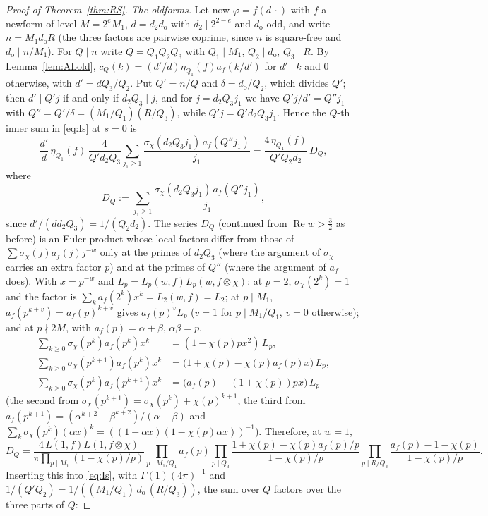 ﻿\documentclass[11pt]{amsart}
\theoremstyle{remark}
\begin{document}
\begin{proof}[Proof of Theorem~\ref{thm:RS}]
\emph{The oldforms.} Let now $\varphi=f(d\,\cdot)$ with $f$ a newform of level $M=2^eM_1$, $d=d_2d_{\mathrm{o}}$ with $d_2\mid2^{2-e}$ and $d_{\mathrm{o}}$ odd, and write $n=M_1d_{\mathrm{o}}R$ (the three factors are pairwise coprime, since $n$ is square-free and $d_{\mathrm{o}}\mid n/M_1$). For $Q\mid n$ write $Q=Q_1Q_2Q_3$ with $Q_1\mid M_1$, $Q_2\mid d_{\mathrm{o}}$, $Q_3\mid R$. By Lemma~\ref{lem:ALold}, $c_Q(k)=(d'/d)\eta_{Q_1}(f)a_f(k/d')$ for $d'\mid k$ and $0$ otherwise, with $d'=dQ_3/Q_2$. Put $Q'=n/Q$ and $\delta=d_{\mathrm{o}}/Q_2$, which divides $Q'$; then $d'\mid Q'j$ if and only if $d_2Q_3\mid j$, and for $j=d_2Q_3j_1$ we have $Q'j/d'=Q''j_1$ with $Q''=Q'/\delta=(M_1/Q_1)(R/Q_3)$, while $Q'j=Q'd_2Q_3j_1$. Hence the $Q$-th inner sum in \eqref{eq:Is} at $s=0$ is
\[
\frac{d'}{d}\,\eta_{Q_1}(f)\,\frac{4}{Q'd_2Q_3}\sum_{j_1\ge1}\frac{\sigma_\chi(d_2Q_3j_1)\,a_f(Q''j_1)}{j_1}=\frac{4\,\eta_{Q_1}(f)}{Q'Q_2d_2}\,D_Q,
\]
where
\[
D_Q:=\sum_{j_1\ge1}\frac{\sigma_\chi(d_2Q_3j_1)\,a_f(Q''j_1)}{j_1},
\]
since $d'/(dd_2Q_3)=1/(Q_2d_2)$. The series $D_Q$ (continued from $\operatorname{Re}w>\frac32$ as before) is an Euler product whose local factors differ from those of $\sum\sigma_\chi(j)a_f(j)j^{-w}$ only at the primes of $d_2Q_3$ (where the argument of $\sigma_\chi$ carries an extra factor $p$) and at the primes of $Q''$ (where the argument of $a_f$ does). With $x=p^{-w}$ and $L_p=L_p(w,f)L_p(w,f\otimes\chi)$: at $p=2$, $\sigma_\chi(2^k)=1$ and the factor is $\sum_ka_f(2^k)x^k=L_2(w,f)=L_2$; at $p\mid M_1$, $a_f(p^{k+v})=a_f(p)^{k+v}$ gives $a_f(p)^vL_p$ ($v=1$ for $p\mid M_1/Q_1$, $v=0$ otherwise); and at $p\nmid2M$, with $a_f(p)=\alpha+\beta$, $\alpha\beta=p$,
\begin{align*}
\sum_{k\ge0}\sigma_\chi(p^k)a_f(p^k)x^k&=(1-\chi(p)px^2)\,L_p,\\
\sum_{k\ge0}\sigma_\chi(p^{k+1})a_f(p^k)x^k&=\bigl(1+\chi(p)-\chi(p)a_f(p)x\bigr)\,L_p,\\
\sum_{k\ge0}\sigma_\chi(p^k)a_f(p^{k+1})x^k&=\bigl(a_f(p)-(1+\chi(p))px\bigr)\,L_p
\end{align*}
(the second from $\sigma_\chi(p^{k+1})=\sigma_\chi(p^k)+\chi(p)^{k+1}$, the third from $a_f(p^{k+1})=(\alpha^{k+2}-\beta^{k+2})/(\alpha-\beta)$ and $\sum_k\sigma_\chi(p^k)(\alpha x)^k=((1-\alpha x)(1-\chi(p)\alpha x))^{-1}$). Therefore, at $w=1$,
\[
D_Q=\frac{4\,L(1,f)L(1,f\otimes\chi)}{\pi\prod_{p\mid M_1}(1-\chi(p)/p)}\prod_{p\mid M_1/Q_1}a_f(p)\prod_{p\mid Q_3}\frac{1+\chi(p)-\chi(p)a_f(p)/p}{1-\chi(p)/p}\prod_{p\mid R/Q_3}\frac{a_f(p)-1-\chi(p)}{1-\chi(p)/p}.
\]
Inserting this into \eqref{eq:Is}, with $\Gamma(1)(4\pi)^{-1}$ and $1/(Q'Q_2)=1/((M_1/Q_1)\,d_{\mathrm{o}}\,(R/Q_3))$, the sum over $Q$ factors over the three parts of $Q$:

\end{proof}
\end{document}
